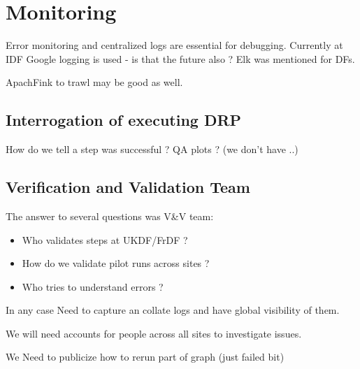 \section{Monitoring}

Error monitoring and centralized logs are essential for debugging.
Currently at IDF Google logging is used -  is that the future also ?
Elk was mentioned for DFs.

ApachFink to trawl may be good as well.

\subsection{Interrogation of executing DRP }
How do we tell a step was successful ? QA plots ? (we don't have ..)

\subsection {Verification and Validation Team}
The answer to several questions was V\&V team:
\begin{itemize}
\item Who validates steps at UKDF/FrDF ?
\item How do we validate pilot runs across sites ?
\item Who tries to understand errors ?
\end{itemize}


In any case Need to capture an collate logs and have  global visibility of them.

We will need accounts for people across all sites to investigate issues.

We Need to publicize how to rerun part of graph (just failed bit)
